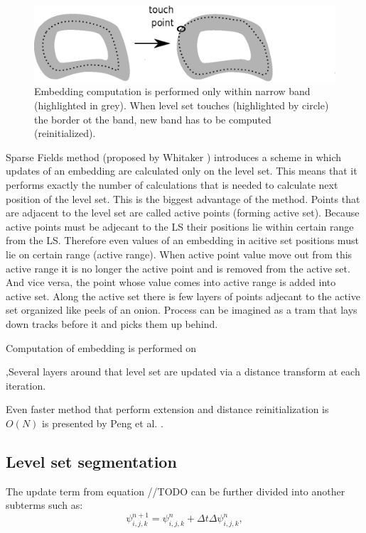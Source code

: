 \begin{figure}
    \centering
    \includegraphics[width=14cm]{data/narrowBands.eps}
    \caption[Narrow bands computation illustration]{Embedding computation is performed only within narrow band (highlighted in grey). When level set touches (highlighted by circle) the border ot the band, new band has to be computed (reinitialized).}
    \label{fg:narrowBands}
\end{figure}

Sparse Fields method (proposed by Whitaker \cite{sparseFilelds}) introduces a scheme in which updates of an embedding are calculated only on the level set. This means that it performs exactly the number of calculations that is needed to calculate next position of the level set. This is the biggest advantage of the method. Points that are adjacent to the level set are called active points (forming active set). Because active points must be adjecant to the LS their positions lie within certain range from the LS. Therefore even values of an embedding in acitive set positions must lie on certain range (active range). When active point value move out from this active range it is no longer the active point and is removed from the active set. And vice versa, the point whose value comes into active range is added into active set. Along the active set there is few layers of points adjecant to the active set organized like peels of an onion. 
Process can be imagined as a tram that lays down tracks before it and picks them up behind.

 Computation of embedding is performed on 

,Several layers around that level set are updated via a distance transform at each iteration.

Even faster method that perform extension and distance reinitialization is $O(N)$ is presented by Peng et al. \cite{pengSparseFields}.

\subsection{Level set segmentation}

The update term from equation //TODO can be further divided into another subterms such as:
\begin{equation}
\psi_{i,j,k}^{n+1} = \psi_{i,j,k}^{n} + \Delta t \Delta \psi_{i,j,k}^{n},
\end{equation}

